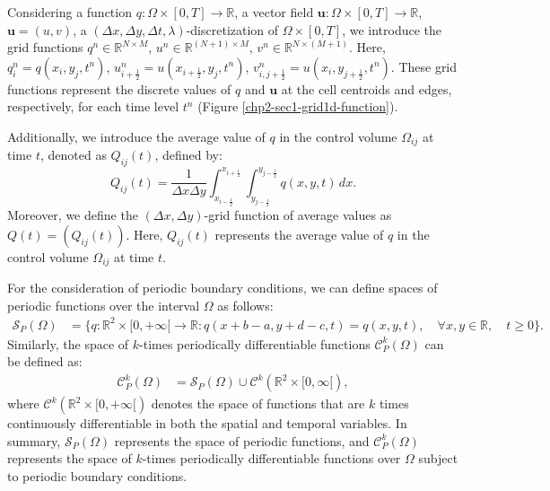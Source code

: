 Considering a function $q:\Omega\times[0,T] \to \mathbb{R}$,
a vector field $\boldsymbol{u}:\Omega\times[0,T] \to \mathbb{R}$, $\boldsymbol{u}=(u,v)$,
a $(\Delta x,\Delta y, \Delta t, \lambda)$-discretization
of $\Omega\times[0,T]$, we introduce the grid functions $q^n \in \mathbb{R}^{N\times M}$,
$u^n \in \mathbb{R}^{(N+1)\times M}$, $v^n \in \mathbb{R}^{N\times (M+1)}$. 
Here, ${q}^n_{i} = {q}(x_i, y_j,t^{n})$, $u^n_{i+\frac{1}{2}} = u(x_{i+\frac{1}{2}},y_j, t^n)$,
$v^n_{i,j+\frac{1}{2}} = u(x_i,y_{j+\frac{1}{2}}, t^n)$.
These grid functions represent the discrete values of $q$ and $\boldsymbol{u}$
at the cell centroids and edges, respectively,
for each time level $t^n$ (Figure \ref{chp2-sec1-grid1d-function}).

Additionally, we introduce the average value of $q$ in the control volume
$\Omega_{ij}$ at time $t$, denoted as ${Q}_{ij}(t)$, defined by:
\begin{equation}
	\label{chp3-sec1-not2}
	{Q}_{ij}(t) = \frac{1}{\Delta x \Delta y}
	\int_{x_{i-\frac{1}{2}}}^{x_{i+\frac{1}{2}}} \int_{y_{j-\frac{1}{2}}}^{y_{j-\frac{1}{2}}} {q}(x,y,t) \,dx.
\end{equation}
Moreover, we define the $(\Delta x, \Delta y)$-grid function of average values as $Q(t) = (Q_{ij}(t))$.
Here, $Q_{ij}(t)$ represents the average value of $q$ in the control volume $\Omega_{ij}$ at time $t$.

For the consideration of periodic boundary conditions, we can define spaces of periodic functions over 
the interval $\Omega$ as follows:
\begin{align*}
	\mathcal{S}_P(\Omega) &= \{q:\mathbb{R}^2\times[0,+\infty[\to \mathbb{R}: q(x+b-a,y+d-c,t)=q(x,y,t), \quad \forall x,y \in \mathbb{R}, \quad t\geq0\}.
\end{align*}
Similarly, the space of $k$-times periodically differentiable functions $\mathcal{C}_P^k(\Omega)$ can be defined as:
\begin{align*}
	\mathcal{C}_P^k(\Omega) &= \mathcal{S}_P(\Omega)\cup \mathcal{C}^k(\mathbb{R}^2\times[0,\infty[),
\end{align*}
where $\mathcal{C}^k(\mathbb{R}^2\times[0,+\infty[)$ denotes the space of functions that are $k$ 
times continuously differentiable in both the spatial and temporal variables.
In summary, $\mathcal{S}_P(\Omega)$ represents the space of periodic functions, and $\mathcal{C}_P^k(\Omega)$
represents the space of $k$-times periodically differentiable functions over $\Omega$ subject to periodic boundary conditions.


